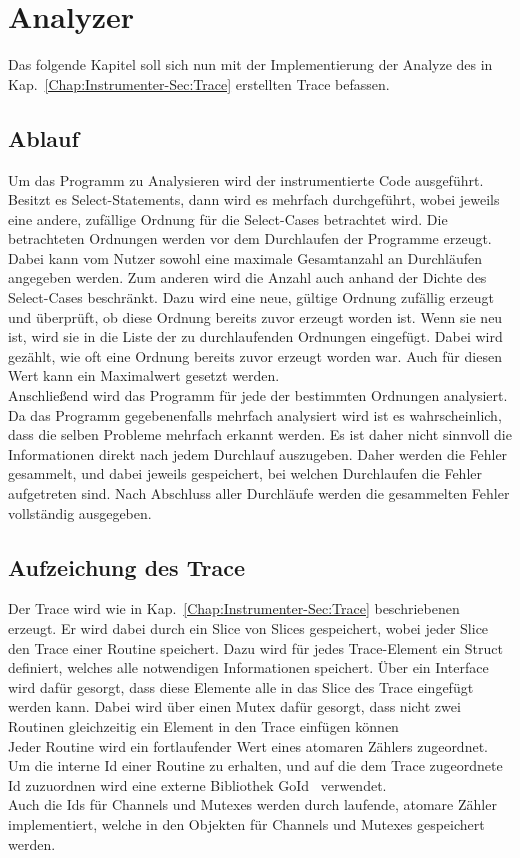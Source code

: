 
\chapter{Analyzer} \label{Chap:Implement}

Das folgende Kapitel soll sich nun mit der Implementierung der Analyze des in 
Kap.~\ref{Chap:Instrumenter-Sec:Trace} erstellten 
Trace befassen.

\section{Ablauf}
Um das Programm zu Analysieren wird der instrumentierte Code ausgeführt.
Besitzt es Select-Statements, dann wird es mehrfach durchgeführt, 
wobei jeweils eine andere, zufällige Ordnung für die Select-Cases 
betrachtet wird. Die betrachteten Ordnungen werden vor dem Durchlaufen 
der Programme erzeugt. Dabei kann vom Nutzer sowohl eine maximale 
Gesamtanzahl an Durchläufen angegeben werden. Zum anderen wird die 
Anzahl auch anhand der Dichte des Select-Cases beschränkt. Dazu wird 
eine neue, gültige Ordnung zufällig erzeugt und überprüft, ob diese 
Ordnung bereits zuvor erzeugt worden ist. Wenn sie neu ist, wird sie in 
die Liste der zu durchlaufenden Ordnungen eingefügt. Dabei wird gezählt,
wie oft eine Ordnung bereits zuvor erzeugt worden war. Auch für diesen 
Wert kann ein Maximalwert gesetzt werden.\\
Anschließend wird das Programm für jede der bestimmten Ordnungen analysiert.
Da das Programm gegebenenfalls mehrfach analysiert wird ist es wahrscheinlich, dass 
die selben Probleme mehrfach erkannt werden. Es ist daher nicht sinnvoll 
die Informationen direkt nach jedem Durchlauf auszugeben. Daher werden die 
Fehler gesammelt, und dabei jeweils gespeichert, bei welchen Durchlaufen die 
Fehler aufgetreten sind. Nach Abschluss aller Durchläufe werden die 
gesammelten Fehler vollständig ausgegeben.

\section{Aufzeichung des Trace}
Der Trace wird wie in Kap.~\ref{Chap:Instrumenter-Sec:Trace}
beschriebenen erzeugt. Er wird dabei durch ein Slice von Slices 
gespeichert, wobei jeder Slice den Trace einer Routine 
speichert. Dazu wird für jedes Trace-Element ein Struct definiert, 
welches alle notwendigen Informationen speichert. Über ein Interface 
wird dafür gesorgt, dass diese Elemente alle in das Slice des Trace eingefügt
werden kann. Dabei wird über einen Mutex dafür gesorgt, dass nicht 
zwei Routinen gleichzeitig ein Element in den Trace einfügen können\\
Jeder Routine wird ein fortlaufender Wert eines atomaren Zählers zugeordnet. 
Um die interne Id einer Routine zu erhalten, und auf die dem Trace zugeordnete 
Id zuzuordnen wird eine externe Bibliothek GoId~\cite{goid} verwendet.\\
Auch die Ids für Channels und Mutexes werden durch laufende, atomare Zähler 
implementiert, welche in den Objekten für Channels und Mutexes gespeichert werden.

